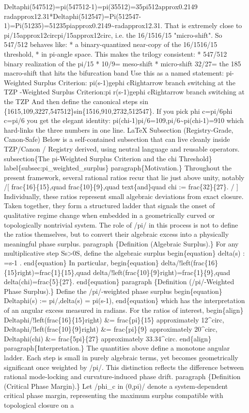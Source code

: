 Deltaphi(547512)=pi(547512-1)=pi(35512)=35pi512approx0.2149 radapprox12.31*Deltaphi(512547)=Pi(512547-1)=Pi(51235)=51235piapprox0.2149\textasciitilde{}radapprox12.31. That is extremely close to pi/15approx12circpi/15approx12circ, i.e. the 16/1516/15 "micro-shift". So 547/512 behaves like: * a binary-quantized near-copy of the 16/1516/15 threshold, * in pi-angle space. This makes the trilogy consistent: * 547/512 binary realization of the pi/15 * 10/9= meso-shift * micro-shift 32/27= the 185 macro-shift that hits the bifurcation band Use this as a named statement: pi-Weighted Surplus Criterion: pi(s-1)gephi cRightarrow branch switching at the TZP -Weighted Surplus Criterion:pi r(s-1)gephi cRightarrow branch switching at the TZP And then define the canonical steps sin \{1615,109,3227,547512\}sin\{1516,910,2732,512547\}. If you pick phi c=pi/6phi c=pi/6 you get the elegant identity: pi(chi-1)pi/6=109,pi/6\textasciitilde{}pi(chi-1)=910 which hard-links the three numbers in one line. LaTeX Subsection (Registry-Grade, Canon-Safe) Below is a self-contained subsection that can live cleanly inside TZP/Canon / Registry derived, using neutral language and reusable operators. subsection\{The pi-Weighted Surplus Criterion and the chi Threshold\} label\{subsec:pi\_weighted\_surplus\} paragraph\{Motivation.\} Throughout the present framework, several rational ratios recur that lie just above unity, notably /[ frac\{16\}\{15\},quad frac\{10\}\{9\},quad text\{and\}quad chi := frac\{32\}\{27\}. / ] Individually, these ratios represent small algebraic deviations from exact closure. Taken together, they form a structured ladder that signals the onset of qualitative regime change when embedded in a geometrically curved or topologically nontrivial system. The role of /pi/ in this process is not to define the ratios themselves, but to convert their algebraic excess into a physically meaningful phase surplus. paragraph \{Definition (Algebraic Surplus).\} For any multiplicative step Ss>0S, define the algebraic surplus begin\{equation\} delta(s) : =s-1 . end\{equation\} In particular, begin\{equation\} delta/!left(frac\{16\}\{15\}right)=frac\{1\}\{15\},quad delta/!left(frac\{10\}\{9\}right)=frac\{1\}\{9\},quad delta(chi)=frac\{5\}\{27\}. end\{equation\} paragraph \{Definition (/pi/-Weighted Phase Surplus).\} Define the /pi/-weighted phase surplus begin\{equation\} Deltaphi(s) := pi/,delta(s) = pi(s-1), end\{equation\} which has the interpretation of an angular excess measured in radians. For the ratios of interest, begin\{align\} Deltaphi/!left(frac\{16\}\{15\}right) \&= frac\{pi\}\{15\} approximately 12\textasciicircum{}circ, Deltaphi/!left(frac\{10\}\{9\}right) \&= frac\{pi\}\{9\} approximately 20\textasciicircum{}circ, Deltaphi(chi) \&= frac\{5pi\}\{27\} approximately 33.34\textasciicircum{}circ. end\{align\} paragraph\{Interpretation.\} The quantities above define a monotone angular ladder. Each step is small in purely algebraic terms, yet becomes geometrically significant once weighted by /pi/. This distinction reflects the difference between rational mode-locking and curvature-induced phase drift. paragraph \{Definition (Critical Phase Margin).\} Let /phi\_c in (0,pi)/ denote a system-dependent critical phase margin, representing the maximum surplus compatible with topological closure on a 